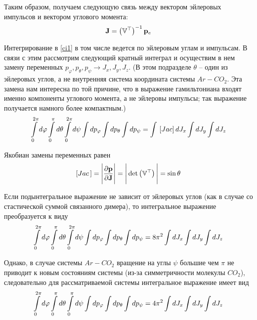 Таким образом, получаем следующую связь между вектором эйлеровых импульсов и вектором углового момента:
\vverh
\begin{gather}
	\mathbf{J} = \left( \mathbb{V}^\top \right)^{-1} \mathbf{p}_e \notag
\end{gather}

Интегрирование в \eqref{ci1} в том числе ведется по эйлеровым углам и импульсам. В связи с этим рассмотрим следующий кратный интеграл и осуществим в нем замену переменных $p_\varphi, p_\theta, p_\psi \longrightarrow J_x, J_y, J_z$. (В этом подразделе $\theta$ -- один из эйлеровых углов, а не внутренняя система координата системы $Ar-CO_2$. Эта замена нам интересна по той причине, что в выражение гамильтониана входят именно компоненты углового момента, а не эйлеровы импульсы; так выражение получается намного более компактным.)
\vverh
\begin{gather}
	\int\limits_{0}^{2 \pi} d \varphi \int\limits_{0}^{\pi} d \theta \int\limits_{0}^{2 \pi} d \psi \int d p_\varphi \int d p_\theta \int d p_\psi = \int \, \left[ Jac \right] d J_x \int d J_y \int d J_z \notag
\end{gather}

Якобиан замены переменных равен
\vverh
\begin{gather}
	\left[ Jac \, \right] = \Bigg{|} \frac{\partial \mathbf{p}}{\partial \mathbf{J}} \Bigg{|} = \Bigg{|} \det \left( \mathbb{V}^\top \right) \Bigg{|} = \sin \theta \notag
\end{gather}

Если подынтегральное выражение не зависит от эйлеровых углов (как в случае со стастической суммой связанного димера), то интегральное выражение преобразуется к виду
\vverh
\begin{gather}
	\int\limits_{0}^{2 \pi} d \varphi \int\limits_{0}^{\pi} d \theta \int\limits_{0}^{2 \pi} d \psi \int d p_\varphi \int d p_\theta \int d p_\psi = 8 \pi^2 \int d J_x \int d J_y \int d J_z \notag 
\end{gather}

Однако, в случае системы $Ar-CO_2$ вращение на углы $\psi$ большие чем $\pi$ не приводит к новым состояниям системы (из-за симметричности молекулы $CO_2$), следовательно для рассматриваемой системы интегральное выражение имеет вид
\vverh
\begin{gather}
	\int\limits_{0}^{2 \pi} d \varphi \int\limits_{0}^{\pi} d \theta \int\limits_{0}^{\pi} d \psi \int d p_\varphi \int d p_\theta \int d p_\psi = 4 \pi^2 \int d J_x \int d J_y \int d J_z \notag 
\end{gather}

